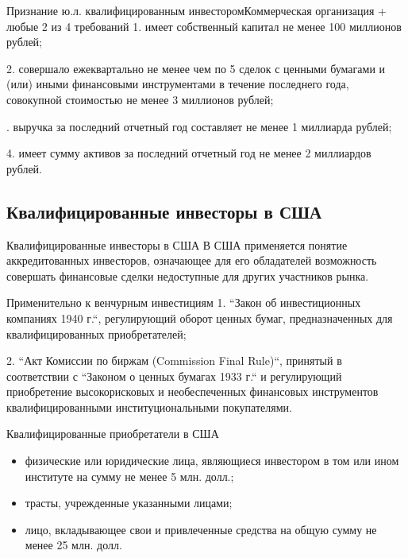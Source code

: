 \documentclass[_Venture_p1.tex]{subfiles}
\begin{document}
\begin{frame}[allowframebreaks]{\setfontsize{12pt}Признание ю.л. квалифицированным инвестором}{Коммерческая организация + любые 2 из 4 требований}
1.	имеет собственный капитал не менее 100 миллионов рублей;

2.	совершало ежеквартально не менее чем по 5 сделок с ценными бумагами и (или) иными финансовыми инструментами в течение последнего года, совокупной стоимостью не менее 3 миллионов рублей;

.	выручка за последний отчетный год составляет не менее 1 миллиарда рублей;

4.	имеет сумму активов за последний отчетный год не менее 2 миллиардов рублей.

\end{frame}
\subsection{Квалифицированные инвесторы в США}
\begin{frame}{Квалифицированные инвесторы в США}
В США применяется понятие аккредитованных инвесторов, означающее для его обладателей возможность совершать финансовые сделки недоступные для других участников рынка. 
\end{frame}

\begin{frame}{Применительно к венчурным инвестициям}
1.	``Закон об инвестиционных компаниях 1940 г.``, регулирующий оборот ценных бумаг, предназначенных для квалифицированных приобретателей;


2.	``Акт Комиссии по биржам (Commission Final Rule)``, принятый в соответствии с ``Законом о ценных бумагах 1933 г.``  и регулирующий приобретение высокорисковых и необеспеченных финансовых инструментов квалифицированными институциональными покупателями.

\end{frame}

\begin{frame}{Квалифицированные приобретатели в США}
\begin{itemize}
	\item физические или юридические лица, являющиеся инвестором в том или ином институте на сумму не менее 5 млн. долл.;
	\item трасты, учрежденные указанными лицами;
	\item лицо, вкладывающее свои и привлеченные средства на общую сумму не менее 25 млн. долл.
\end{itemize}
\end{frame}
\end{document}
